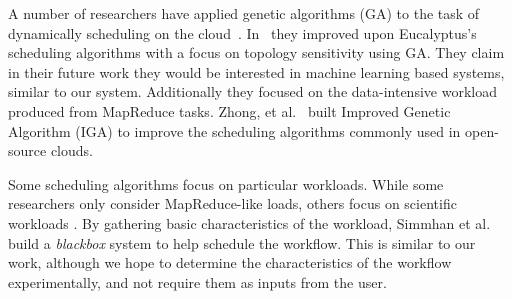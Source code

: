 
A number of researchers have applied genetic algorithms (GA) to the task of
dynamically scheduling on the cloud~\cite{Lee,Zhong,Chenhong}.  In~\cite{Lee}
they improved upon Eucalyptus's scheduling algorithms with a focus on topology
sensitivity using GA.  They claim in their future work they would be interested
in machine learning based systems, similar to our system.  Additionally they
focused on the data-intensive workload produced from MapReduce tasks. Zhong, et
al.~\cite{Zhong} built Improved Genetic Algorithm (IGA) to improve the
scheduling algorithms commonly used in open-source clouds.



Some scheduling algorithms focus on particular workloads.  While some
researchers only consider MapReduce-like loads, others focus on scientific
workloads \cite{Juve,Simmhan,Hoffa}.  By gathering basic characteristics of the
workload, Simmhan et al.~\cite{Simmhan} build a \emph{blackbox} system to help
schedule the workflow.  This is similar to our work, although we hope to
determine the characteristics of the workflow experimentally, and not require
them as inputs from the user.
